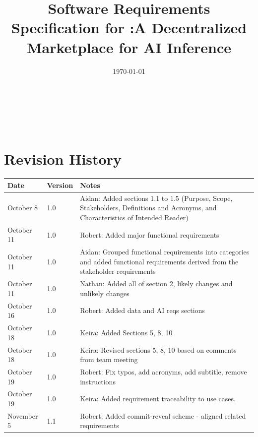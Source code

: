 \documentclass[12pt]{article}
\begin{document}
\title{Software Requirements Specification for \progname{}:\newline A Decentralized Marketplace for AI Inference}
\author{\authname}
\date{\today}
	
\maketitle

~\newpage


\tableofcontents

~\newpage

\section*{Revision History}

\begin{tabularx}{\textwidth}{p{3cm}p{2cm}X}
\toprule {\bf Date} & {\bf Version} & {\bf Notes}\\
\midrule
October 8 & 1.0 & Aidan: Added sections 1.1 to 1.5 (Purpose, Scope, Stakeholders, Definitions and Acronyms, and Characteristics of Intended Reader)\\
October 11 & 1.0 & Robert: Added major functional requirements\\
October 11 & 1.0 & Aidan: Grouped functional requirements into categories and added functional requirements derived from the stakeholder requirements\\
October 11 & 1.0 & Nathan: Added all of section 2, likely changes and unlikely changes\\
October 16 & 1.0 & Robert: Added data and AI reqs sections\\
October 18 & 1.0 & Keira: Added Sections 5, 8, 10 \\
October 18 & 1.0 & Keira: Revised sections 5, 8, 10 based on comments from team meeting \\
October 19 & 1.0 & Robert: Fix typos, add acronyms, add subtitle, remove instructions\\
October 19 & 1.0 & Keira: Added requirement traceability to use cases. \\
November 5 & 1.1 & Robert: Added commit-reveal scheme - aligned related requirements\\
\bottomrule
\end{tabularx}

~\\
\end{document}
